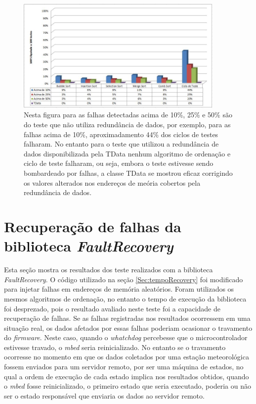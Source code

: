\begin{figure}[h]
	\centering
	\includegraphics[width=0.9\textwidth]{figuras/falhaTData.jpg}
	\caption[Teste de redundância de dados da classe TData ]{Nesta figura para as falhas detectadas acima de 10\%, 25\% e 50\% são do teste que não utiliza redundância de dados, por exemplo, para as falhas acima de 10\%, aproximadamento 44\% dos ciclos de testes falharam. No entanto para o teste que utilizou a redundância de dados disponibilizada pela TData nenhum algoritmo de ordenação e ciclo de teste falharam, ou seja, embora o teste estivesse sendo bombardeado por falhas, a classe TData se mostrou eficaz corrigindo os valores alterados nos endereços de meória cobertos pela redundância de dados.}
	\label{Img:falhaTData}	
\end{figure}

\newpage
\section{Recuperação de falhas da biblioteca \textit{FaultRecovery}}\label{Sec:recupeFault}

Esta seção mostra os resultados dos teste realizados com a biblioteca \textit{FaultRecovery}. O código utilizado na seção \ref{Sec:tempoRecovery} foi modificado para injetar falhas em endereços de memória aleatórios. Foram utilizados os mesmos algoritmos de ordenação, no entanto o tempo de execução da biblioteca foi desprezado, pois o resultado avaliado neste teste foi a capacidade de recuperação de falhas. Se as falhas registradas nos resultados ocorressem em uma situação real, os dados afetados por essas falhas poderiam ocasionar o travamento do \textit{firmware}. Neste caso, quando o \textit{whatchdog} percebesse que o microcontrolador estivesse travado, o \textit{mbed} seria reinicializado. No entanto se o travamento ocorresse no momento em que os dados coletados por uma estação meteorológica fossem enviados para um servidor remoto, por ser uma máquina de estados, no qual a ordem de execução de cada estado implica nos resultados obtidos, quando o \textit{mbed} fosse reinicializado, o primeiro estado que seria executado, poderia ou não ser o estado responsável que enviaria os dados ao servidor remoto. 

